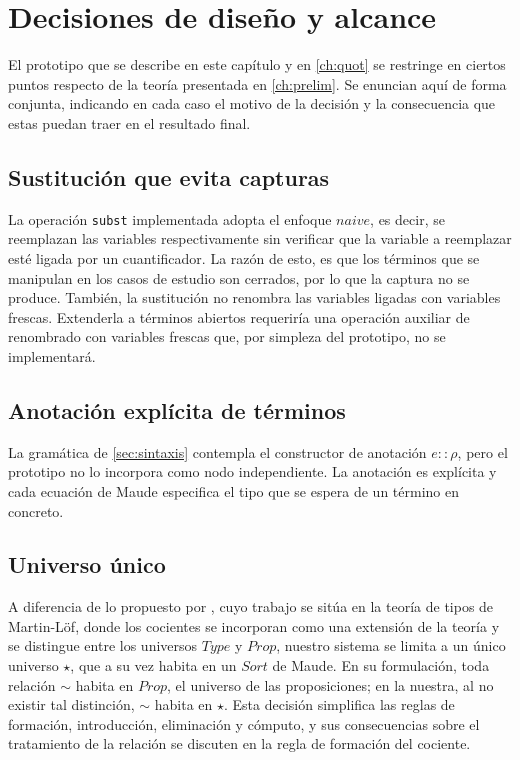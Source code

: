 \section{Decisiones de diseño y alcance}\label{sec:alcance}
El prototipo que se describe en este capítulo y en \cref{ch:quot} se restringe en ciertos puntos respecto de la teoría presentada en \cref{ch:prelim}. Se enuncian aquí de forma conjunta, indicando en cada caso el motivo de la decisión y la consecuencia que estas puedan traer en el resultado final.

\subsection{Sustitución que evita capturas}
La operación \texttt{subst} implementada adopta el enfoque $naive$, es decir, se reemplazan las variables respectivamente sin verificar que la variable a reemplazar esté ligada por un cuantificador. La razón de esto, es que los términos que se manipulan en los casos de estudio son cerrados, por lo que la captura no se produce. También, la sustitución no renombra las variables ligadas con variables frescas. Extenderla a términos abiertos requeriría una operación auxiliar de renombrado con variables frescas que, por simpleza del prototipo, no se implementará.

\subsection{Anotación explícita de términos}
La gramática de \cref{sec:sintaxis} contempla el constructor de anotación $e :: \rho$, pero el prototipo no lo incorpora como nodo independiente. La anotación es explícita y cada ecuación de Maude especifica el tipo que se espera de un término en concreto.

\subsection{Universo único}
A diferencia de lo propuesto por \cite{nuoli}, cuyo trabajo se sitúa en la teoría de tipos de Martin-Löf, donde los cocientes se incorporan como una extensión de la teoría y se distingue entre los universos $Type$ y $Prop$, nuestro sistema se limita a un único universo $\star$, que a su vez habita en un $Sort$ de Maude. En su formulación, toda relación $\sim$ habita en $Prop$, el universo de las proposiciones; en la nuestra, al no existir tal distinción, $\sim$ habita en $\star$. Esta decisión simplifica las reglas de formación, introducción, eliminación y cómputo, y sus consecuencias sobre el tratamiento de la relación se discuten en la regla de formación del cociente.

